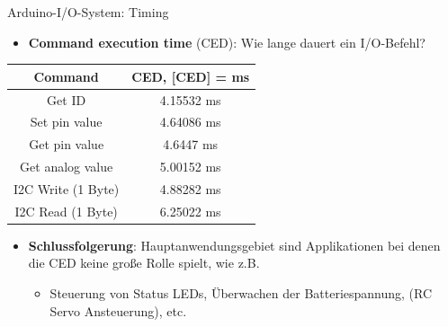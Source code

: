 \documentclass{beamer}
\begin{document}
\begin{frame}{Arduino-I/O-System: Timing}
	\begin{itemize}
		\item \textbf{Command execution time} (CED): Wie lange dauert ein I/O-Befehl?
	\end{itemize}
	\begin{table}[htbp]
		\begin{tabular}{|c|c|}
			\hline 
			\textbf{Command} & \textbf{CED, [CED] = ms} \\ 
			\hline \hline 
			Get ID & 4.15532 ms \\ 
			\hline 
			Set pin value & 4.64086 ms  \\ 
			\hline
			Get pin value & 4.6447 ms \\ 
			\hline
			Get analog value & 5.00152 ms \\ 
			\hline
			I2C Write (1 Byte)  & 4.88282 ms\\ 
			\hline
			I2C Read (1 Byte) & 6.25022 ms \\
			\hline
		\end{tabular}
	\end{table}
	\begin{itemize}
		\item \textbf{Schlussfolgerung}: Hauptanwendungsgebiet sind Applikationen bei denen die CED keine gro\ss{}e Rolle spielt, wie z.B.
		\begin{itemize}
			\item Steuerung von Status LEDs, \"Uberwachen der Batteriespannung, (RC Servo Ansteuerung), etc.
		\end{itemize}
	\end{itemize}
\end{frame}
\end{document}
